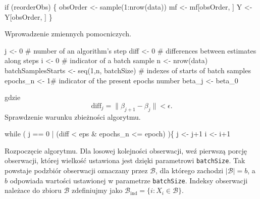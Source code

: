 \documentclass[]{article}
\newenvironment{Shaded}{}{}
\newcommand{\KeywordTok}[1]{\textcolor[rgb]{0.00,0.00,1.00}{{#1}}}
\newcommand{\DecValTok}[1]{{#1}}
\newcommand{\StringTok}[1]{\textcolor[rgb]{0.00,0.50,0.50}{{#1}}}
\newcommand{\CommentTok}[1]{\textcolor[rgb]{0.00,0.50,0.00}{{#1}}}
\newcommand{\NormalTok}[1]{{#1}}
\begin{document}
\begin{Shaded}
\begin{Highlighting}[]
  \NormalTok{if (reorderObs) \{}
    \NormalTok{obsOrder <-}\StringTok{ }\KeywordTok{sample}\NormalTok{(}\DecValTok{1}\NormalTok{:}\KeywordTok{nrow}\NormalTok{(data))}
    \NormalTok{mf <-}\StringTok{ }\NormalTok{mf[obsOrder, ]}
    \NormalTok{Y <-}\StringTok{ }\NormalTok{Y[obsOrder, ]}
  \NormalTok{\}}
\end{Highlighting}
\end{Shaded}

Wprowadzenie zmiennych pomocniczych.

\begin{Shaded}
\begin{Highlighting}[]
  \NormalTok{j <-}\StringTok{ }\DecValTok{0} \CommentTok{# number of an algorithm's step}
  \NormalTok{diff <-}\StringTok{ }\DecValTok{0} \CommentTok{# differences between estimates along steps}
  \NormalTok{i <-}\StringTok{ }\DecValTok{0} \CommentTok{# indicator of a batch sample}
  \NormalTok{n <-}\StringTok{ }\KeywordTok{nrow}\NormalTok{(data)}
  \NormalTok{batchSamplesStarts <-}\StringTok{ }\KeywordTok{seq}\NormalTok{(}\DecValTok{1}\NormalTok{,n, batchSize) }\CommentTok{# indexes of starts of batch samples}
  \NormalTok{epochs_n <-}\StringTok{ }\DecValTok{1}\CommentTok{# indicator of the present epochs number}
  \NormalTok{beta_j <-}\StringTok{ }\NormalTok{beta_0}
\end{Highlighting}
\end{Shaded}

gdzie
\[ \text{diff}_{j} = \parallel \beta_{j+1}-\beta_j\parallel < \epsilon .\]
Sprawdzenie warunku zbieżności algorytmu.

\begin{Shaded}
\begin{Highlighting}[]
  \NormalTok{while ( j ==}\StringTok{ }\DecValTok{0} \NormalTok{|}\StringTok{ }\NormalTok{(diff <}\StringTok{ }\NormalTok{eps &}\StringTok{ }\NormalTok{epochs_n <=}\StringTok{ }\NormalTok{epoch) )\{}
    \NormalTok{j <-}\StringTok{ }\NormalTok{j}\DecValTok{+1}
    \NormalTok{i <-}\StringTok{ }\NormalTok{i}\DecValTok{+1}
\end{Highlighting}
\end{Shaded}

Rozpoczęcie algorytmu. Dla losowej kolejności obserwacji, weź pierwszą
porcję obserwacji, której wielkość ustawiona jest dzięki parametrowi
\texttt{batchSize}. Tak powstaje podzbiór obserwacji oznaczany przez
\(\mathcal{B}\), dla którego zachodzi \(|\mathcal{B}| = b\), a \(b\)
odpowiada wartości ustawionej w parametrze \texttt{batchSize}. Indeksy
obserwacji należace do zbioru \(\mathcal{B}\) zdefiniujmy jako
\(\mathcal{B}_{\text{ind}} = \{i: X_i \in \mathcal{B} \}\).
\end{document}
